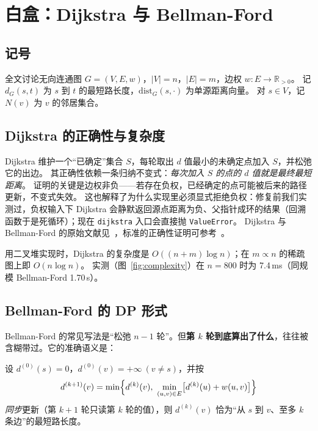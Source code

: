 ﻿\section{白盒：Dijkstra 与 Bellman-Ford}\label{sec:white}

\subsection{记号}

全文讨论无向连通图 $G=(V,E,w)$，$|V|=n$，$|E|=m$，边权 $w:E\to\mathbb{R}_{>0}$。
记 $d_G(s,t)$ 为 $s$ 到 $t$ 的最短路长度，$\mathrm{dist}_G(s,\cdot)$ 为单源距离向量。
对 $s\in V$，记 $N(v)$ 为 $v$ 的邻居集合。

\subsection{Dijkstra 的正确性与复杂度}

Dijkstra 维护一个“已确定”集合 $S$，每轮取出 $d$ 值最小的未确定点加入 $S$，并松弛它的出边。
其正确性依赖一条归纳不变式：\emph{每次加入 $S$ 的点的 $d$ 值就是最终最短距离}。
证明的关键是边权非负——若存在负权，已经确定的点可能被后来的路径更新，不变式失效。
这也解释了为什么实现里必须显式拒绝负权：修复前我们实测过，负权输入下 Dijkstra 会静默返回源点距离为负、父指针成环的结果（回溯函数于是死循环）；现在 \texttt{dijkstra} 入口会直接抛 \texttt{ValueError}。
Dijkstra 与 Bellman-Ford 的原始文献见~\cite{dijkstra1959,bellman1958}，标准的正确性证明可参考~\cite{cormen2009clrs}。

用二叉堆实现时，Dijkstra 的复杂度是 $O((n+m)\log n)$；在 $m\propto n$ 的稀疏图上即 $O(n\log n)$。
实测（图~\ref{fig:complexity}）在 $n=800$ 时为 7.4\,ms（同规模 Bellman-Ford 1.70\,s）。

\subsection{Bellman-Ford 的 DP 形式}\label{sec:bf}

Bellman-Ford 的常见写法是“松弛 $n-1$ 轮”。但\textbf{第 $k$ 轮到底算出了什么}，往往被含糊带过。它的准确语义是：

\begin{proposition}[轮数语义]\label{prop:rounds}
设 $d^{(0)}(s)=0$，$d^{(0)}(v)=+\infty\ (v\ne s)$，并按
\begin{equation}
d^{(k+1)}(v)=\min\Bigl\{d^{(k)}(v),\ \min_{(u,v)\in E}\bigl[d^{(k)}(u)+w(u,v)\bigr]\Bigr\}
\label{eq:bf}
\end{equation}
\emph{同步}更新（第 $k+1$ 轮只读第 $k$ 轮的值），则 $d^{(k)}(v)$ 恰为“从 $s$ 到 $v$、至多 $k$ 条边”的最短路长度。
\end{proposition}

